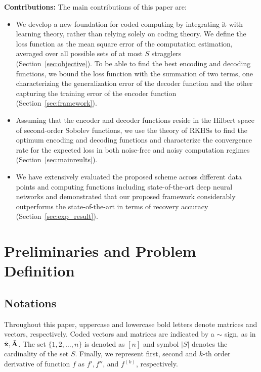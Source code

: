 \documentclass{article}
\begin{document}
\textbf{Contributions:} The main contributions of this paper are:
\begin{itemize}%
   \item We develop a new foundation for coded computing by integrating it with learning theory, rather than relying solely on coding theory. We define the loss function as the mean square error of the computation estimation, averaged over all possible sets of at most $S$ stragglers (Section~\ref{sec:objective}). To be able to find the best encoding and decoding functions, we bound the loss function with the summation of two terms, one characterizing the generalization error of the decoder function and the other capturing the training error of the encoder function (Section~\ref{sec:framework}).
    
    \item Assuming that the encoder and decoder functions reside in the Hilbert space of second-order Sobolev functions, we use the theory of RKHSs to find the optimum encoding and decoding functions and characterize the 
    convergence rate for the expected loss in both noise-free and noisy computation regimes  (Section~\ref{sec:mainreults}).
    
    \item We have extensively evaluated the proposed scheme across different data points and computing functions including state-of-the-art deep neural networks and demonstrated that our proposed framework considerably outperforms the state-of-the-art in terms of recovery accuracy (Section~\ref{sec:exp_result}).
\end{itemize}

\section{Preliminaries and Problem Definition}
\subsection{Notations}
Throughout this paper, uppercase and lowercase bold letters denote matrices and vectors, respectively. Coded vectors and matrices are indicated by a $\sim$ sign, as in $\Tilde{\mathbf{x}}, \Tilde{\mathbf{A}}$. The set $\{1, 2, \dots, n\}$ is denoted as $[n]$ and symbol $|S|$ denotes the cardinality of the set $S$. Finally, we represent first, second and $k$-th order derivative of function $f$ as $f',f''$, and $f^{(k)}$, respectively.
\end{document}
